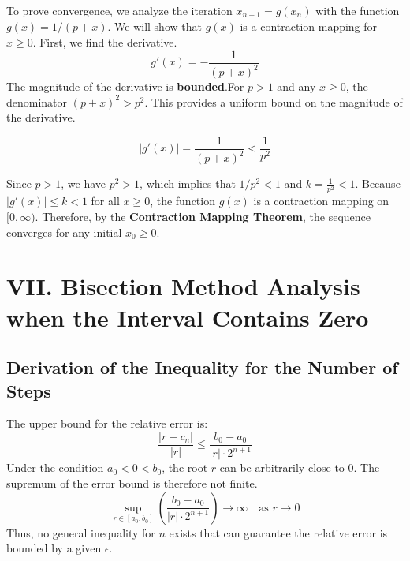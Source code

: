 \documentclass[a4paper]{article}
\begin{document}
To prove convergence, we analyze the iteration $x_{n+1} = g(x_n)$ with the function $g(x) = 1/(p+x)$.
We will show that $g(x)$ is a contraction mapping for $x \ge 0$. First, we find the derivative.
\[
g'(x) = -\frac{1}{(p+x)^2}
\]
The magnitude of the derivative is \textbf{bounded}.For $p > 1$ and any $x \ge 0$, the denominator $(p+x)^2 > p^2$.
This provides a uniform bound on the magnitude of the derivative.

\[
|g'(x)| = \frac{1}{(p+x)^2} < \frac{1}{p^2}
\]

Since $p>1$, we have $p^2 > 1$, which implies that  $1/p^2 < 1$ and $k = \frac{1}{p^2} < 1$.
Because $|g'(x)| \le k < 1$ for all $x \ge 0$, the function $g(x)$ is a contraction mapping on $[0, \infty)$.
Therefore, by the \textbf{Contraction Mapping Theorem}, the sequence converges for any initial $x_0 \ge 0$.



\section*{VII. Bisection Method Analysis when the Interval Contains Zero}

\subsection*{Derivation of the Inequality for the Number of Steps}

The upper bound for the relative error is:
\[
\frac{|r-c_n|}{|r|} \le \frac{b_0 - a_0}{|r| \cdot 2^{n+1}}
\]
Under the condition $a_0 < 0 < b_0$, the root $r$ can be arbitrarily close to 0. The supremum of the error bound is therefore not finite.
\[
\sup_{r \in [a_0,b_0]} \left( \frac{b_0 - a_0}{|r| \cdot 2^{n+1}} \right) \to \infty \quad \text{as } r \to 0
\]
Thus, no general inequality for $n$ exists that can guarantee the relative error is bounded by a given $\epsilon$.
\end{document}
